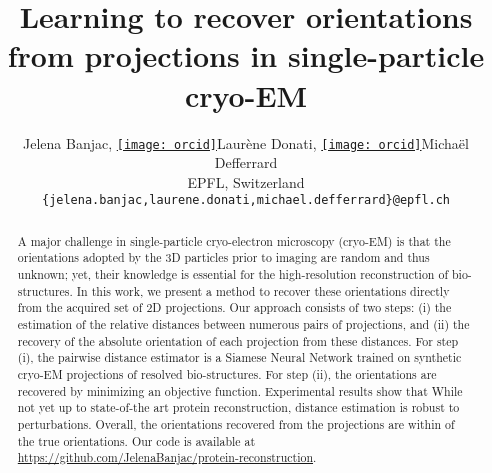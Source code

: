 \documentclass{article}
\author{
    Jelena Banjac, \href{https://orcid.org/0000-0001-9834-7755}{\texttt{[image: orcid]}\hspace{1mm}}Laurène Donati, \href{https://orcid.org/0000-0000-0000-0000}{\texttt{[image: orcid]}\hspace{1mm}}Michaël Defferrard \\
    EPFL, Switzerland \\
    \texttt{\{jelena.banjac,laurene.donati,michael.defferrard\}@epfl.ch}
}
\date{}
\title{Learning to recover orientations from projections in single-particle cryo-EM}
\begin{document}
\maketitle

\begin{abstract}
    A major challenge in single-particle cryo-electron microscopy (cryo-EM) is that the orientations adopted by the 3D particles prior to imaging are random and thus unknown; yet, their knowledge is essential for the high-resolution reconstruction of bio-structures. In this work, we present a method to recover these orientations directly from the acquired set of 2D projections. Our approach consists of two steps: (i) the estimation of the relative distances between numerous pairs of projections, and (ii) the recovery of the absolute orientation of each projection from these distances.
    For step (i), the pairwise distance estimator is a Siamese Neural Network trained on synthetic cryo-EM projections of resolved bio-structures.
    For step (ii), the orientations are recovered by minimizing an objective function.
    Experimental results show that  %
    While not yet up to state-of-the art protein reconstruction, distance estimation is robust to perturbations.
    Overall, the orientations recovered from the  projections are within \todo{10\degree} of the true orientations.
    Our code is available at \url{https://github.com/JelenaBanjac/protein-reconstruction}.
\end{abstract}


\end{document}

